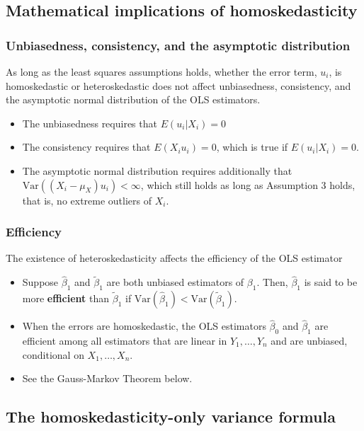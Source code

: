\documentclass[a4paper,11pt]{article}
\newcommand{\var}{\mathrm{Var}}
\begin{document}
\subsection{Mathematical implications of homoskedasticity}
\label{sec:orga7fe578}

\subsubsection*{Unbiasedness, consistency, and the asymptotic distribution}
\label{sec:orgbb52b96}

As long as the least squares assumptions holds, whether the error
term, \(u_i\), is homoskedastic or heteroskedastic does not affect
unbiasedness, consistency, and the asymptotic normal distribution
of the OLS estimators.
\begin{itemize}
\item The unbiasedness requires that \(E(u_i|X_i) = 0\)
\item The consistency requires that \(E(X_i u_i) = 0\), which is true if
\(E(u_i|X_i)=0\).
\item The asymptotic normal distribution requires additionally that
\(\var((X_i-\mu_X)u_i) < \infty\), which still holds as long as
Assumption 3 holds, that is, no extreme outliers of \(X_i\).
\end{itemize}

\subsubsection*{Efficiency}
\label{sec:orga04b30d}

The existence of heteroskedasticity affects the efficiency of the
OLS estimator
\begin{itemize}
\item Suppose \(\hat{\beta}_1\) and \(\tilde{\beta}_1\) are both unbiased
estimators of \(\beta_1\). Then, \(\hat{\beta}_1\) is said to be more
\textbf{efficient} than \(\tilde{\beta}_1\) if \(\var(\hat{\beta}_1) <
  \var(\tilde{\beta}_1)\).
\item When the errors are homoskedastic, the OLS estimators
\(\hat{\beta}_0\) and \(\hat{\beta}_1\) are efficient among all
estimators that are linear in \(Y_1, \ldots, Y_n\) and are unbiased,
conditional on \(X_1, \ldots, X_n\).

\item See the Gauss-Markov Theorem below.
\end{itemize}


\subsection{The homoskedasticity-only variance formula}
\label{sec:org90daa3e}
\end{document}

